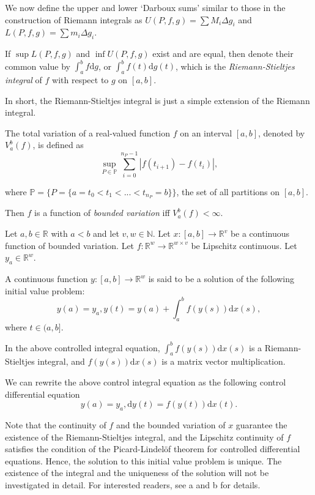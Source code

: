 \documentclass[a4paper,11pt,titlepage]{article}
\theoremstyle{definition}
\theoremstyle{plain}
\theoremstyle{remark}
\begin{document}
We now define the upper and lower ‘Darboux sums’ similar to those in the construction of Riemann integrals as $U(P,f,g)=\sum M_i\Delta g_i$ and $L(P,f,g)=\sum m_i\Delta g_i$.

If $\sup L(P,f,g)$ and $\inf U(P,f,g)$ exist and are equal, then denote their common value by $\int^b_af\mathrm{d}g$, or $\int^b_af(t)\mathrm{d}g(t)$, which is the \textit{Riemann-Stieltjes integral} of $f$ with respect to $g$ on $[a,b]$.

In short, the Riemann-Stieltjes integral is just a simple extension of the Riemann integral.

The total variation of a real-valued function $f$ on an interval $[a,b]$, denoted by $V_a^b(f)$, is defined as
$$\sup_{P\in\mathbb{P}}\sum_{i=0}^{n_P-1}\left|f(t_{i+1})-f(t_i)\right|,$$

where $\mathbb{P}=\{P=\{a=t_0<t_1<...<t_{n_P}=b\}\}$, the set of all partitions on $[a,b]$.

Then $f$ is a function of \textit{bounded variation} iff $V_a^b(f)<\infty$.

Let $a,b\in\mathbb{R}$ with $a<b$ and let $v,w\in\mathbb{N}$. Let $x:[a,b]\rightarrow\mathbb{R}^v$ be a continuous function of bounded variation. Let $f:\mathbb{R}^w\rightarrow\mathbb{R}^{w\times v}$ be Lipschitz continuous. Let $y_a\in\mathbb{R}^w$.

A continuous function $y:[a,b]\rightarrow\mathbb{R}^w$ is said to be a solution of the following initial value problem:
$$y(a)=y_a, y(t)=y(a)+\int_a^bf(y(s))\mathrm{d}x(s),$$
where $t\in(a,b].$

In the above controlled integral equation, $\int_a^bf(y(s))\mathrm{d}x(s)$ is a Riemann-Stieltjes integral, and $f(y(s))\mathrm{d}x(s)$ is a matrix vector multiplication.

We can rewrite the above control integral equation as the following control differential equation
$$y(a)=y_a, \mathrm{d}y(t) = f(y(t))\mathrm{d}x(t).$$

Note that the continuity of $f$ and the bounded variation of $x$ guarantee the existence of the Riemann-Stieltjes integral, and the Lipschitz continuity of $f$ satisfies the condition of the Picard-Lindelöf theorem for controlled differential equations. Hence, the solution to this initial value problem is unique. The existence of the integral and the uniqueness of the solution will not be investigated in detail. For interested readers, see a and b for details.
\end{document}

